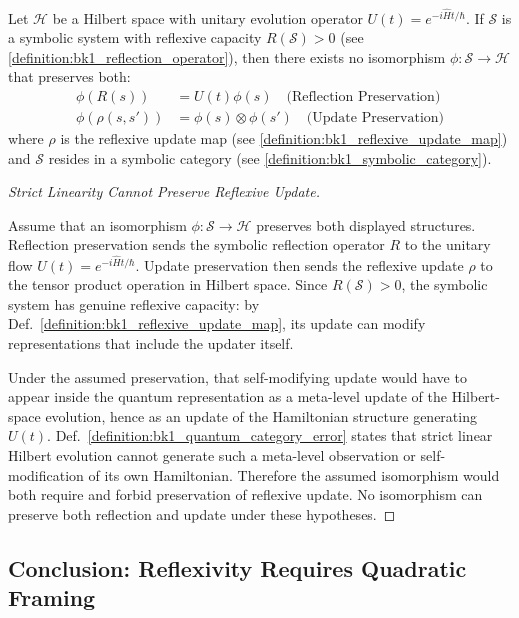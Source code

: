 \begin{lemma}
\label{lemma:bk1_symbolic_quantum_incompatibility}
Let $\mathcal{H}$ be a Hilbert space with unitary evolution operator $U(t)=e^{-i\hat{H}t/\hbar}$. If $\mathcal{S}$ is a symbolic system with reflexive capacity $R(\mathcal{S}) > 0$ (see \ref{definition:bk1_reflection_operator}), then there exists no isomorphism $\phi: \mathcal{S} \to \mathcal{H}$ that preserves both:
\begin{align}
\phi(R(s)) &= U(t)\phi(s) \quad \text{(Reflection Preservation)} \\
\phi(\rho(s, s')) &= \phi(s) \otimes \phi(s') \quad \text{(Update Preservation)}
\end{align}
where $\rho$ is the reflexive update map (see \ref{definition:bk1_reflexive_update_map}) and $\mathcal{S}$ resides in a symbolic category (see \ref{definition:bk1_symbolic_category}).
\end{lemma}
\begin{proof}[Strict Linearity Cannot Preserve Reflexive Update]
\label{proof:bk1_symbolic_quantum_incompatibility}
\leavevmode

Assume that an isomorphism \(\phi:\mathcal{S}\to\mathcal{H}\) preserves both
displayed structures. Reflection preservation sends the symbolic reflection
operator \(R\) to the unitary flow \(U(t)=e^{-i\hat Ht/\hbar}\). Update
preservation then sends the reflexive update \(\rho\) to the tensor product
operation in Hilbert space. Since \(R(\mathcal{S})>0\), the symbolic system has
genuine reflexive capacity: by Def.~\ref{definition:bk1_reflexive_update_map},
its update can modify representations that include the updater itself.

Under the assumed preservation, that self-modifying update would have to appear
inside the quantum representation as a meta-level update of the Hilbert-space
evolution, hence as an update of the Hamiltonian structure generating
\(U(t)\). Def.~\ref{definition:bk1_quantum_category_error} states that strict
linear Hilbert evolution cannot generate such a meta-level observation or
self-modification of its own Hamiltonian. Therefore the assumed isomorphism
would both require and forbid preservation of reflexive update. No isomorphism
can preserve both reflection and update under these hypotheses.
\end{proof}

\subsection{Conclusion: Reflexivity Requires Quadratic Framing}
\label{subsec:bk1_reflexivity_requires_quadratic_framing}


